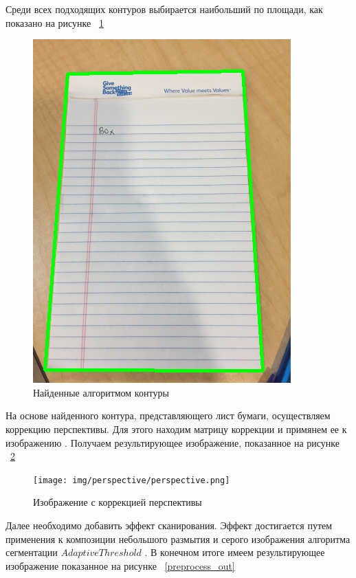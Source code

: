 Среди всех подходящих контуров выбирается наибольший по площади, как показано на рисунке ~\ref{contours}
\begin{figure}
    \includegraphics[scale=0.5]{img/perspective/contours.png}
    \caption{Найденные алгоритмом контуры}
    \label{contours}
\end{figure}


На основе найденного контура, представляющего лист бумаги, осуществляем коррекцию перспективы. Для этого находим матрицу коррекции \cite{opencv_perspective_transform} и примянем ее к изображению \cite{opencv_warp_perspective}.
Получаем результирующее изображение, показанное на рисунке ~\ref{perspective_correction}
\begin{figure}
    \texttt{[image: img/perspective/perspective.png]}
    \caption{Изображение с коррекцией перспективы}
    \label{perspective_correction}
\end{figure}

Далее необходимо добавить эффект сканирования. Эффект достигается путем применения к композиции небольшого размытия и серого изображения алгоритма сегментации $Adaptive Threshold$ \cite{opencv_threshold}. 
В конечном итоге имеем результирующее изображение показанное на рисунке ~\ref{preprocess_out}


